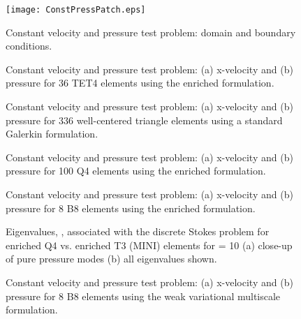 \documentclass[11pt]{amsart}
\begin{document}
\begin{figure}[htb!]
	\centering
  \texttt{[image: ConstPressPatch.eps]}
	\caption{Constant velocity and pressure test problem: domain and boundary conditions.}
	\label{fig:ConstPressPatch}
\end{figure}
\begin{figure}[htb!]
	\centering
{}
	\caption{Constant velocity and pressure test problem: (a) x-velocity and (b) pressure for 36 TET4 elements using the enriched formulation.}
	\label{fig:TET4VelPress}
\end{figure}
\begin{figure}[htb!]
	\centering
{}
	\caption{Constant velocity and pressure test problem: (a) x-velocity and (b) pressure for 336 well-centered triangle elements using a standard Galerkin formulation.}
	\label{fig:WCTVelPress}
\end{figure}
\begin{figure}[htb!]
	\centering
{}
	\caption{Constant velocity and pressure test problem: (a) x-velocity and (b) pressure for 100 Q4 elements using the enriched formulation.}
	\label{fig:Kabab1}
\end{figure}
\begin{figure}[htb!]
	\centering
{}
	\caption{Constant velocity and pressure test problem: (a) x-velocity and (b) pressure for 8 B8 elements using the enriched formulation.}
	\label{fig:ConstantFlowCoarse}
\end{figure}
\begin{figure}[htb!]
	\centering
	\caption{Eigenvalues, , associated with the discrete Stokes problem for enriched Q4 vs. enriched T3 (MINI) elements for  = 10 (a) close-up of pure pressure modes (b) all eigenvalues shown.}
	\label{fig:Eigenvalue}
\end{figure}
\begin{figure}[htb!]
	\centering
{}
	\caption{Constant velocity and pressure test problem: (a) x-velocity and (b) pressure for 8 B8 elements using the weak variational multiscale formulation.}
	\label{fig:StabilizedCoarse}
\end{figure}
\end{document}
